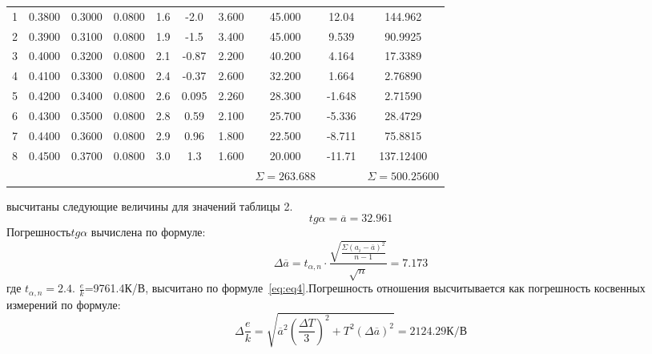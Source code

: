 \begin{center}
\begin{table}[H]
\begin{tabular}{|c|c|c|c|c|c|c|c|c|c|}
\begin{minipage}{21mm}
\end{minipage}\\
\hline
1 &  0.3800  &  0.3000  & 0.0800 & 1.6& -2.0&3.600 & 45.000 &12.04 & 144.962\\
2 &  0.3900  &  0.3100  &  0.0800 & 1.9& -1.5&3.400 &45.000 &9.539 &90.9925\\
3 &  0.4000  &  0.3200  & 0.0800  & 2.1& -0.87&2.200 &40.200 &4.164 &17.3389\\
4 & 0.4100  &  0.3300 &  0.0800 & 2.4& -0.37&2.600  &32.200 &1.664 &2.76890\\
5 & 0.4200  &  0.3400  &  0.0800 &  2.6&0.095 &2.260 &28.300 &-1.648 &2.71590  \\
6 & 0.4300  &  0.3500  &  0.0800 & 2.8&0.59 &2.100 &25.700 &-5.336 &28.4729 \\
7 & 0.4400  &  0.3600  &  0.0800 & 2.9&0.96 &1.800 &22.500 &-8.711 & 75.8815 \\
8 & 0.4500  &  0.3700  &  0.0800 & 3.0& 1.3 &1.600 &20.000 &-11.71 &137.12400  \\
 &   &    &   & &  & & $\Sigma=263.688$& & $\Sigma=500.25600$ \\

\hline
\end{tabular}
\end{table}
\end{center}
 высчитаны следующие величины для значений таблицы 2.
\begin{equation}
    tg{\alpha}=\overline{a}=32.961
\end{equation}
Погрешность$tg{\alpha}$ вычислена по формуле:
\begin{equation}
    \Delta\overline{a}=t_{\alpha,n}\cdot\frac{\sqrt{\frac{\Sigma(a_i-\overline{a})^2}{{n-1}}}}{\sqrt{n}}=7.173
\end{equation}
где $t_{\alpha,n}=2.4$.
 $\frac{e}{k}$=9761.4К/В, высчитано по формуле~\ref{eq:eq4}.Погрешность отношения высчитывается как погрешность косвенных измерений по формуле:
\begin{equation}
    \Delta\frac{e}{k}=\sqrt{\overline{a}^2(\frac{\Delta T}{3})^2+T^2(\Delta\overline{a})^2}=2124.29 \text{К/В}
\end{equation}




